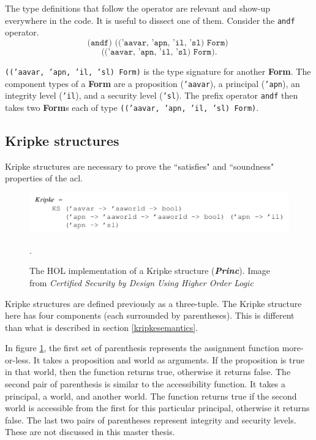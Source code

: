 \documentclass[../../main/main.tex]{subfiles}
\begin{document}
The type definitions that follow the operator are relevant and show-up everywhere in the code.  It is useful to dissect one of them.  Consider the \texttt{andf} operator.  
\[ \texttt{(andf) (('aavar, 'apn, 'il, 'sl) Form) }\]
\[ \texttt{(('aavar, 'apn, 'il, 'sl) Form)}. \]


\texttt{(('aavar, 'apn, 'il, 'sl) Form)} is the type signature for another \textbf{Form}.  The component types of a \textbf{Form} are a proposition (\texttt{'aavar}), a principal (\texttt{'apn}), an integrity level (\texttt{'il}), and a security level (\texttt{'sl}).  The prefix operator \texttt{andf} then takes two \textbf{Form}s each of type \texttt{(('aavar, 'apn, 'il, 'sl) Form)}.  
\subsection{Kripke structures}
Kripke structures are necessary to prove the ``satisfies" and ``soundness" properties of the \gls{acl}.   


\begin{figure}[h]
\centering
\includegraphics[width=1.0\textwidth]{../figures/kripkehol}
\caption{\label{kripkehol}The HOL implementation of a Kripke structure (\textbf{\textit{Princ}}).  Image from  \textit{Certified Security by Design Using Higher Order Logic}\cite{certmanual}}.  
\end{figure}

Kripke structures are defined previously as a three-tuple.  The Kripke structure here has four components (each surrounded by parentheses). This is different than what is described in section \ref{kripkesemantics}. 

In figure \ref{kripkehol}, the first set of parenthesis represents the assignment function more-or-less. It takes a proposition and world as arguments.  If the proposition is true in that world, then the function returns true, otherwise it returns false.  The second pair of parenthesis is similar to the accessibility function.  It takes a principal, a world, and another world.  The function returns true if the second world is accessible from the first for this particular principal, otherwise it returns false.  The last two pairs of parentheses represent integrity and security levels.  These are not discussed in this master thesis.  
\end{document}
